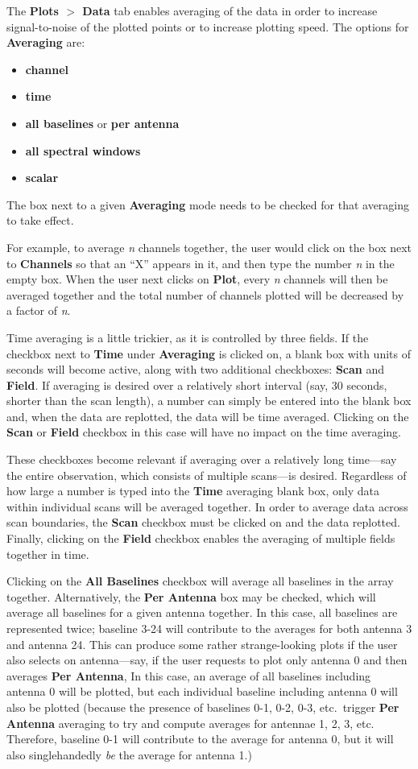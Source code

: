 The {\bf Plots $>$ Data} tab enables averaging of the data in order to
increase signal-to-noise of the plotted points or to increase plotting
speed. The options for {\bf Averaging} are: 
\begin{itemize}
   \item {\bf channel}
   \item {\bf time}
   \item {\bf all baselines} or {\bf per antenna}
   \item {\bf all spectral windows}
   \item {\bf scalar}
\end{itemize}
The box next to a given {\bf Averaging} mode needs to be checked for
that averaging to take effect.

For example, to average {\it n} channels together, the user would
click on the box next to {\bf Channels} so that an ``X'' appears in
it, and then type the number {\it n} in the empty box. When the user
next clicks on {\bf Plot}, every {\it n} channels will then be
averaged together and the total number of channels plotted will be
decreased by a factor of {\it n}.

Time averaging is a little trickier, as it is controlled by three
fields. If the checkbox next to {\bf Time} under {\bf Averaging} is
clicked on, a blank box with units of seconds will become active,
along with two additional checkboxes: {\bf Scan} and {\bf Field}. If
averaging is desired over a relatively short interval (say, 30
seconds, shorter than the scan length), a number can simply be entered
into the blank box and, when the data are replotted, the data will be
time averaged. Clicking on the {\bf Scan} or {\bf Field} checkbox in
this case will have no impact on the time averaging.

These checkboxes become relevant if averaging over a relatively long
time---say the entire observation, which consists of multiple
scans---is desired. Regardless of how large a number is typed into the
{\bf Time} averaging blank box, only data within individual scans will
be averaged together. In order to average data across scan boundaries,
the {\bf Scan} checkbox must be clicked on and the data
replotted. Finally, clicking on the {\bf Field} checkbox enables the
averaging of multiple fields together in time.

Clicking on the {\bf All Baselines} checkbox will average all
baselines in the array together. Alternatively, the {\bf Per Antenna}
box may be checked, which will average all baselines for a given
antenna together. In this case, all baselines are represented twice;
baseline 3-24 will contribute to the averages for both antenna 3 and
antenna 24. This can produce some rather strange-looking plots if the
user also selects on antenna---say, if the user requests to plot only
antenna 0 and then averages {\bf Per Antenna}, In this case, an
average of all baselines including antenna 0 will be plotted, but each
individual baseline including antenna 0 will also be plotted (because
the presence of baselines 0-1, 0-2, 0-3, etc.~trigger {\bf Per
  Antenna} averaging to try and compute averages for antennae 1, 2, 3,
etc. Therefore, baseline 0-1 will contribute to the average for
antenna 0, but it will also singlehandedly {\it be} the average for
antenna 1.)

